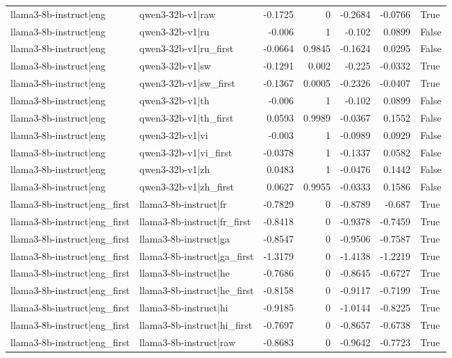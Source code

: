 \begin{table}
\begin{tabular}{l l r r r r l}
llama3-8b-instruct|eng & qwen3-32b-v1|raw & -0.1725 & 0 & -0.2684 & -0.0766 & True \\
llama3-8b-instruct|eng & qwen3-32b-v1|ru & -0.006 & 1 & -0.102 & 0.0899 & False \\
llama3-8b-instruct|eng & qwen3-32b-v1|ru_first & -0.0664 & 0.9845 & -0.1624 & 0.0295 & False \\
llama3-8b-instruct|eng & qwen3-32b-v1|sw & -0.1291 & 0.002 & -0.225 & -0.0332 & True \\
llama3-8b-instruct|eng & qwen3-32b-v1|sw_first & -0.1367 & 0.0005 & -0.2326 & -0.0407 & True \\
llama3-8b-instruct|eng & qwen3-32b-v1|th & -0.006 & 1 & -0.102 & 0.0899 & False \\
llama3-8b-instruct|eng & qwen3-32b-v1|th_first & 0.0593 & 0.9989 & -0.0367 & 0.1552 & False \\
llama3-8b-instruct|eng & qwen3-32b-v1|vi & -0.003 & 1 & -0.0989 & 0.0929 & False \\
llama3-8b-instruct|eng & qwen3-32b-v1|vi_first & -0.0378 & 1 & -0.1337 & 0.0582 & False \\
llama3-8b-instruct|eng & qwen3-32b-v1|zh & 0.0483 & 1 & -0.0476 & 0.1442 & False \\
llama3-8b-instruct|eng & qwen3-32b-v1|zh_first & 0.0627 & 0.9955 & -0.0333 & 0.1586 & False \\
llama3-8b-instruct|eng_first & llama3-8b-instruct|fr & -0.7829 & 0 & -0.8789 & -0.687 & True \\
llama3-8b-instruct|eng_first & llama3-8b-instruct|fr_first & -0.8418 & 0 & -0.9378 & -0.7459 & True \\
llama3-8b-instruct|eng_first & llama3-8b-instruct|ga & -0.8547 & 0 & -0.9506 & -0.7587 & True \\
llama3-8b-instruct|eng_first & llama3-8b-instruct|ga_first & -1.3179 & 0 & -1.4138 & -1.2219 & True \\
llama3-8b-instruct|eng_first & llama3-8b-instruct|he & -0.7686 & 0 & -0.8645 & -0.6727 & True \\
llama3-8b-instruct|eng_first & llama3-8b-instruct|he_first & -0.8158 & 0 & -0.9117 & -0.7199 & True \\
llama3-8b-instruct|eng_first & llama3-8b-instruct|hi & -0.9185 & 0 & -1.0144 & -0.8225 & True \\
llama3-8b-instruct|eng_first & llama3-8b-instruct|hi_first & -0.7697 & 0 & -0.8657 & -0.6738 & True \\
llama3-8b-instruct|eng_first & llama3-8b-instruct|raw & -0.8683 & 0 & -0.9642 & -0.7723 & True \\

\end{tabular}
\end{table}
